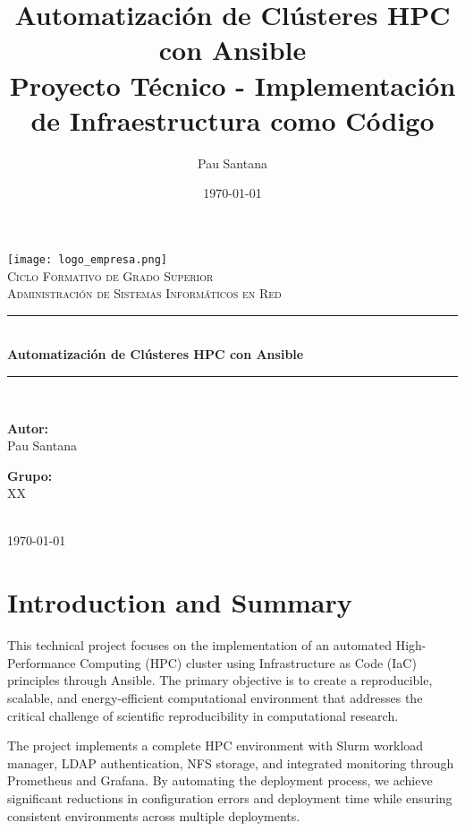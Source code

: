 \documentclass[12pt,a4paper]{report}
\title{\Huge{\textbf{Automatización de Clústeres HPC con Ansible}}\\
       \Large{Proyecto Técnico - Implementación de Infraestructura como Código}}
\author{Pau Santana}
\date{\today}
\begin{document}
\begin{titlepage}
\begin{center}
\vspace*{2cm}
\texttt{[image: logo\_empresa.png]}\\[2cm]
\textsc{\LARGE{Ciclo Formativo de Grado Superior}}\\[0.5cm]
\textsc{\Large{Administración de Sistemas Informáticos en Red}}\\[2cm]
\rule{\linewidth}{0.5mm}\\[0.4cm]
{\huge\bfseries Automatización de Clústeres HPC con Ansible\\[0.4cm]}
\rule{\linewidth}{0.5mm}\\[1.5cm]
\begin{minipage}{0.4\textwidth}
\begin{flushleft}
\large
\textbf{Autor:}\\
Pau Santana\\
\end{flushleft}
\end{minipage}
\begin{minipage}{0.4\textwidth}
\begin{flushright}
\large
\textbf{Grupo:}\\
XX\\
\end{flushright}
\end{minipage}\\[2cm]
{\large \today}
\end{center}
\end{titlepage}

\tableofcontents
\listoffigures
\listoftables
\newpage

\chapter*{Introduction and Summary}

This technical project focuses on the implementation of an automated High-Performance Computing (HPC) cluster using Infrastructure as Code (IaC) principles through Ansible. The primary objective is to create a reproducible, scalable, and energy-efficient computational environment that addresses the critical challenge of scientific reproducibility in computational research.

The project implements a complete HPC environment with Slurm workload manager, LDAP authentication, NFS storage, and integrated monitoring through Prometheus and Grafana. By automating the deployment process, we achieve significant reductions in configuration errors and deployment time while ensuring consistent environments across multiple deployments.
\end{document}
